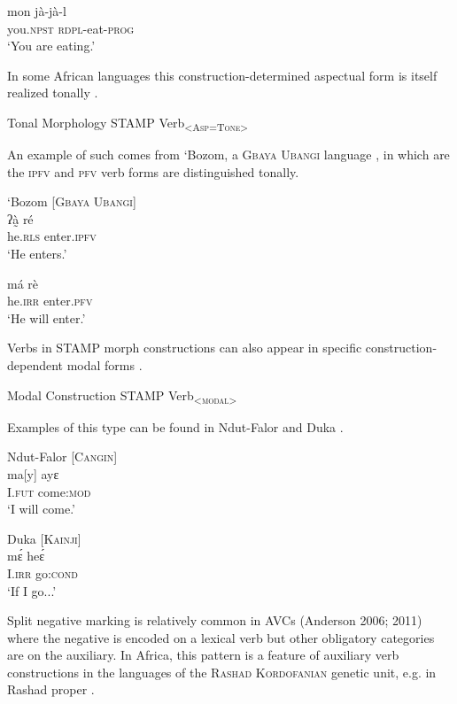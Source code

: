 \documentclass[output=paper]{langsci/langscibook}
\begin{document}
\ex \label{ex:anderson:20b}
\gll  mon    jà-jà-l \\
  you.\textsc{npst}  \textsc{rdpl}-eat-\textsc{prog}\\
\glt `You are eating.'
\z
\z 

In some African languages this construction-determined aspectual form is itself realized tonally .

\ea\label{ex:anderson:21}
  Tonal Morphology  STAMP   Verb\textsc{\textsubscript{<Asp=Tone>}}
\z

An example of such comes from `Bozom, a \textsc{Gbaya Ubangi} language , in which are the \textsc{ipfv} and \textsc{pfv} verb forms are distinguished tonally.

\ea\label{ex:anderson:22}
`Bozom   \citep[159]{Monino1995}        [\textsc{Gbaya Ubangi}]\\
\ea\label{ex:anderson:22a}
\gll ʔà̰    ré  \\
  he\textsc{.rls}     enter.\textsc{ipfv}\\
\glt `He enters.' 

\ex \label{ex:anderson:22b}
\gll  má  rè \\
  he\textsc{.irr}  enter\textsc{.pfv}\\
\glt `He will enter.'
\z
\z

Verbs in STAMP morph constructions can also appear in specific construction-dependent modal forms . 


\ea\label{ex:anderson:23}
Modal Construction  STAMP  Verb\textsubscript{<}\textsc{\textsubscript{modal}}\textsubscript{>}\\
\z

Examples of this type can be found in Ndut-Falor  and Duka .

\ea\label{ex:anderson:24}
Ndut-Falor \citep[Ndut-Falor 4]{Pichl1973}      [\textsc{Cangin}]\\
\gll ma[y]  ayɛ\\
I.\textsc{fut}  come:\textsc{mod}  \\
\glt `I will come.' 
\z

\ea\label{ex:anderson:25}
 Duka  \citep[96-98; 105]{BendorSamuelEtAl1973}    \textsc{[Kainji]}\\
 \gll m\'{ɛ}    he\'{ɛ}   \\
I.\textsc{irr}  go:\textsc{cond}  \\
\glt `If I go...'  
\z

Split negative marking is relatively common in AVCs (Anderson 2006; 2011) where the negative is encoded on a lexical verb but other obligatory categories are on the auxiliary. In Africa, this pattern is a feature of auxiliary verb constructions in the languages of the \textsc{Rashad Kordofanian} genetic unit, e.g. in Rashad proper .
\end{document}
